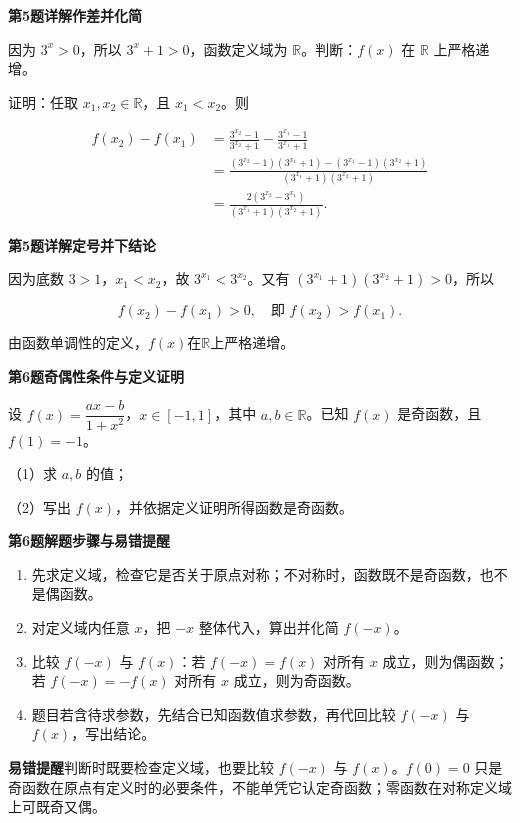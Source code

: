 \documentclass[UTF8,10pt,aspectratio=169]{ctexbeamer}
\newcommand{\PageHeading}[1]{\begin{center}{\Large\bfseries #1}\end{center}\vspace{0.12cm}}
\newcommand{\subq}[1]{\par\vspace{0.15cm}（#1）}
\begin{document}
\begin{frame}[t]
\PageHeading{第5题详解\quad 作差并化简}
因为 $3^x>0$，所以 $3^x+1>0$，函数定义域为 $\mathbb R$。判断：$f(x)$ 在 $\mathbb R$ 上严格递增。
\par
\pause
证明：任取 $x_1,x_2\in\mathbb R$，且 $x_1<x_2$。则
\par
\[\begin{aligned} f(x_2)-f(x_1)&=\frac{3^{x_2}-1}{3^{x_2}+1}-\frac{3^{x_1}-1}{3^{x_1}+1}\\ &=\frac{(3^{x_2}-1)(3^{x_1}+1)-(3^{x_1}-1)(3^{x_2}+1)}{(3^{x_1}+1)(3^{x_2}+1)}\\ &=\frac{2(3^{x_2}-3^{x_1})}{(3^{x_1}+1)(3^{x_2}+1)}.\end{aligned}\]
\par
\end{frame}
\begin{frame}[t]
\PageHeading{第5题详解\quad 定号并下结论}
因为底数 $3>1$，$x_1<x_2$，故 $3^{x_1}<3^{x_2}$。又有 $(3^{x_1}+1)(3^{x_2}+1)>0$，所以
\par
\pause
\[f(x_2)-f(x_1)>0,\quad\text{即 }f(x_2)>f(x_1).\]
\par
由函数单调性的定义，$\boxed{f(x)\text{在}\mathbb R\text{上严格递增}}$。
\par
\end{frame}
\begin{frame}[t]
\PageHeading{第6题\quad 奇偶性条件与定义证明}
设 $f(x)=\dfrac{ax-b}{1+x^2}$，$x\in[-1,1]$，其中 $a,b\in\mathbb R$。已知 $f(x)$ 是奇函数，且 $f(1)=-1$。
\subq{1}求 $a,b$ 的值；
\subq{2}写出 $f(x)$，并依据定义证明所得函数是奇函数。
\par
\end{frame}
\begin{frame}[t]
\PageHeading{第6题\quad 解题步骤与易错提醒}
\begin{enumerate}\item 先求定义域，检查它是否关于原点对称；不对称时，函数既不是奇函数，也不是偶函数。
\item 对定义域内任意 $x$，把 $-x$ 整体代入，算出并化简 $f(-x)$。
\item 比较 $f(-x)$ 与 $f(x)$：若 $f(-x)=f(x)$ 对所有 $x$ 成立，则为偶函数；若 $f(-x)=-f(x)$ 对所有 $x$ 成立，则为奇函数。
\item 题目若含待求参数，先结合已知函数值求参数，再代回比较 $f(-x)$ 与 $f(x)$，写出结论。\end{enumerate}
\par
\pause
\vspace{0.18cm}\textbf{易错提醒}\quad 判断时既要检查定义域，也要比较 $f(-x)$ 与 $f(x)$。$f(0)=0$ 只是奇函数在原点有定义时的必要条件，不能单凭它认定奇函数；零函数在对称定义域上可既奇又偶。
\par
\end{frame}
\end{document}
